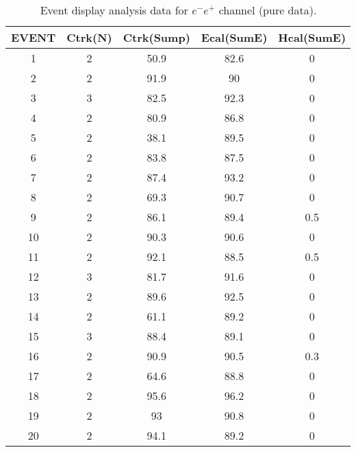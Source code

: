 \begin{table}[h!]
    \centering
    \caption{Event display analysis data for $e^-e^+$ channel (pure data).}
    \begin{tabular}{ccccc}
    \hline
    EVENT & Ctrk(N) & Ctrk(Sump) & Ecal(SumE) & Hcal(SumE) \\ \hline
    1     & 2       & 50.9       & 82.6       & 0          \\
    2     & 2       & 91.9       & 90         & 0          \\
    3     & 3       & 82.5       & 92.3       & 0          \\
    4     & 2       & 80.9       & 86.8       & 0          \\
    5     & 2       & 38.1       & 89.5       & 0          \\
    6     & 2       & 83.8       & 87.5       & 0          \\
    7     & 2       & 87.4       & 93.2       & 0          \\
    8     & 2       & 69.3       & 90.7       & 0          \\
    9     & 2       & 86.1       & 89.4       & 0.5        \\
    10    & 2       & 90.3       & 90.6       & 0          \\
    11    & 2       & 92.1       & 88.5       & 0.5        \\
    12    & 3       & 81.7       & 91.6       & 0          \\
    13    & 2       & 89.6       & 92.5       & 0          \\
    14    & 2       & 61.1       & 89.2       & 0          \\
    15    & 3       & 88.4       & 89.1       & 0          \\
    16    & 2       & 90.9       & 90.5       & 0.3        \\
    17    & 2       & 64.6       & 88.8       & 0          \\
    18    & 2       & 95.6       & 96.2       & 0          \\
    19    & 2       & 93         & 90.8       & 0          \\
    20    & 2       & 94.1       & 89.2       & 0         \\ \hline
    \end{tabular}
    \label{table:ed-ee}
\end{table}
    

